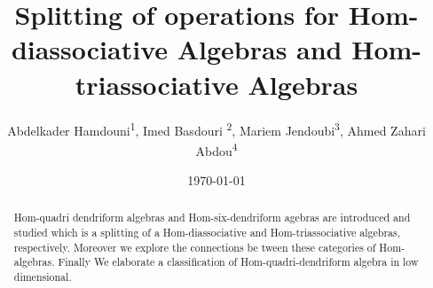 \documentclass[11pt,twoside,reqno]{amsart}
\theoremstyle{plain}
\theoremstyle{definition}
\begin{document}
\title[Splitting of operations for Hom-diassociative and Hom-triassociative Algebras]{Splitting of operations for Hom-diassociative Algebras and Hom-triassociative Algebras}

\author{Abdelkader Hamdouni\textsuperscript{1}, Imed Basdouri \textsuperscript{2}, Mariem Jendoubi\textsuperscript{3}, Ahmed Zahari Abdou\textsuperscript{4}}

\address{\textsuperscript{1} University of Carthage· Higher Institute of Sciences and Technology of Environment of Borj Cedria (ISTEUB),  Tunisia}
\address{\textsuperscript{2} Universit\'e de Gafsa, Facultté des sciences de Gafsa, Tunis}
\address{\textsuperscript{3}D\'epartement de Math\'ematiques, Facult\'e des Sciences, Universit\'e de Sfax, Sfax, Tunisia}
\address{\textsuperscript{4}IRIMAS - D\'epartement de Math\'ematiques, Facult\'e des Sciences, Universit\'e de Haute Alsace, Mulhouse, France}



\date{\today}


	\begin{abstract}  
     Hom-quadri dendriform algebras and Hom-six-dendriform agebras are introduced and studied which is a splitting of a Hom-diassociative and Hom-triassociative algebras, respectively. Moreover we explore the connections be
tween these categories of Hom-algebras. Finally  We elaborate a classification of Hom-quadri-dendriform algebra in low dimensional.
  \end{abstract}

\maketitle 
\end{document}

